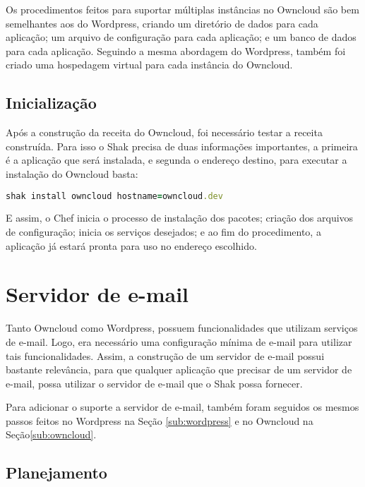 Os procedimentos feitos para suportar múltiplas instâncias
no Owncloud são bem semelhantes aos do Wordpress, criando um diretório de dados
para cada aplicação; um arquivo de configuração para cada aplicação; e um banco de
dados para cada aplicação. Seguindo a mesma abordagem do Wordpress, também
foi criado uma hospedagem virtual para cada instância do Owncloud.

\subsection{Inicialização}

Após a construção da receita do Owncloud, foi necessário testar a receita construída. 
Para isso o Shak precisa de duas informações importantes, a primeira é a aplicação
que será instalada, e segunda o endereço destino, para executar a instalação
do Owncloud basta:

\begin{lstlisting}[language=Ruby,label=dice_index,caption={Exemplo de execução de instalação do Owncloud com shak}]
shak install owncloud hostname=owncloud.dev
\end{lstlisting}

E assim, o Chef inicia o processo de instalação dos pacotes; criação dos arquivos
de configuração; inicia os serviços desejados; e ao fim do procedimento, a aplicação
já estará pronta para uso no endereço escolhido.

\section{Servidor de e-mail}
\label{sub:e-mail}

Tanto Owncloud como Wordpress, possuem funcionalidades que utilizam serviços 
de e-mail. Logo, era necessário uma configuração mínima de e-mail para utilizar 
tais funcionalidades. Assim, a construção de um servidor de e-mail 
possui bastante relevância, para que qualquer aplicação que precisar de um 
servidor de e-mail, possa utilizar o servidor de e-mail que o Shak possa fornecer.

Para adicionar o suporte a servidor de e-mail, também foram seguidos os mesmos passos
feitos no Wordpress na Seção \ref{sub:wordpress} e no Owncloud na Seção\ref{sub:owncloud}. 

\subsection{Planejamento}

